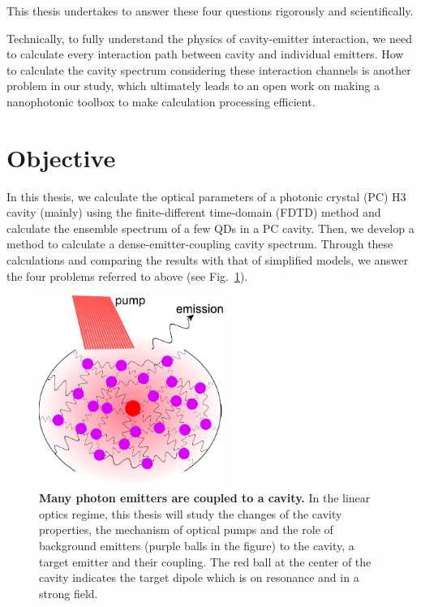 This thesis undertakes to answer these four questions rigorously and scientifically.


Technically, to fully understand the physics of cavity-emitter interaction, we need to calculate every interaction path between cavity and individual emitters. How to calculate the cavity spectrum considering these interaction channels is another problem in our study, which ultimately leads to an open work on making a nanophotonic toolbox to make calculation processing efficient.

\section{Objective}
In this thesis, we calculate the optical parameters of a photonic crystal (PC) H3 cavity (mainly) using the finite-different time-domain (FDTD) method and  calculate the ensemble spectrum of a few QDs in a PC cavity. Then, we develop a method to calculate a dense-emitter-coupling cavity spectrum. Through these calculations and comparing the results with that of simplified models, we answer the four problems referred to above (see Fig.~\ref{Cavity_pump}).


\begin{figure}[htp]%
\centering
\begin{center}
\includegraphics[width=6cm]{./Figs/Cavity_pump}%
\end{center}
\caption[Many photon emitters are coupled to a cavity.]{\textbf{Many photon emitters are coupled to a cavity.} In the linear optics regime, this thesis will study the changes of the cavity properties, the mechanism of optical pumps and the role of background emitters (purple balls in the figure) to the cavity, a target emitter and their coupling. The red ball at the center of the cavity indicates the target dipole which is on resonance and in a strong field.}
\label{Cavity_pump}
\end{figure}

